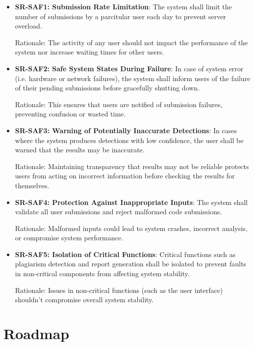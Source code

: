 \documentclass{article}
\begin{document}
\begin{itemize}
\item \textbf{SR-SAF1: Submission Rate Limitation}: The system shall limit the number of submissions by a parcitular user each day to prevent server overload.

Rationale: The activity of any user should not impact the performance of the system nor increase waiting times for other users.

\item \textbf{SR-SAF2: Safe System States During Failure}: In case of system error (i.e. hardware or network failures), the system shall inform users of the failure of their pending submissions before gracefully shutting down.

Rationale: This ensures that users are notified of submission failures, preventing confusion or wasted time.

\item \textbf{SR-SAF3: Warning of Potentially Inaccurate Detections}: In cases where the system produces detections with low confidence, the user shall be warned that the results may be inaccurate.

Rationale: Maintaining transparency that results may not be reliable protects users from acting on incorrect information before checking the results for themselves.

\item \textbf{SR-SAF4: Protection Against Inappropriate Inputs}: The system shall validate all user submissions and reject malformed code submissions.

Rationale: Malformed inputs could lead to system crashes, incorrect analysis, or compromise system performance.

\item \textbf{SR-SAF5: Isolation of Critical Functions}: Critical functions such as plagiarism detection and report generation shall be isolated to prevent faults in non-critical components from affecting system stability.

Rationale: Issues in non-critical functions (such as the user interface) shouldn't compromise overall system stability.

\end{itemize}

\section{Roadmap}

\end{document}
